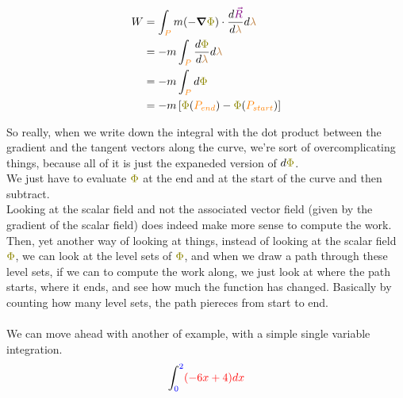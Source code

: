 \begin{align*}
    W &= \int_{\begingroup\color{orange}P\endgroup} m(-\grad{\begingroup\color{olive}\Phi\endgroup}) \cdot \frac{d\begingroup\color{violet}\vec{R}\endgroup}{d\begingroup\color{brown}\lambda\endgroup} d\begingroup\color{brown}\lambda\endgroup\\
    &= -m \int_{\begingroup\color{orange}P\endgroup} \frac{d \begingroup\color{olive}\Phi\endgroup}{d \begingroup\color{brown}\lambda\endgroup}d\begingroup\color{brown}\lambda\endgroup\\
    &= -m \int_{\begingroup\color{orange}P\endgroup} d \begingroup\color{olive}\Phi\endgroup\\
    &= -m \left[\begingroup\color{olive}\Phi\endgroup(\begingroup\color{orange}P_{end}\endgroup) - \begingroup\color{olive}\Phi\endgroup(\begingroup\color{orange}P_{start}\endgroup)\right]
\end{align*}

So really, when we write down the integral with the dot product between the gradient and the tangent vectors along the curve, we're sort of overcomplicating things, 
because all of it is just the expaneded version of $d \begingroup\color{olive}\Phi\endgroup$.\\
We just have to evaluate $\begingroup\color{olive}\Phi\endgroup$ at the end and at the start of the curve and then subtract.\\

Looking at the scalar field and not the associated vector field (given by the gradient of the scalar field) does indeed make more sense to compute
the work.\\
Then, yet another way of looking at things, instead of looking at the scalar field $\begingroup\color{olive}\Phi\endgroup$, we can look at the level sets of $\begingroup\color{olive}\Phi\endgroup$, 
and when we draw a path through these level sets, if we can to compute the work along, we just look at where the path starts, where it ends, and see how much 
the function has changed. Basically by counting how many level sets, the path piereces from start to end.\\\\

We can move ahead with another of example, with a simple single variable integration.\\

\begin{align*}
   \int_{\begingroup\color{blue}0\endgroup}^{\begingroup\color{blue}2\endgroup} \begingroup\color{red}(-6x + 4)dx\endgroup
\end{align*}

